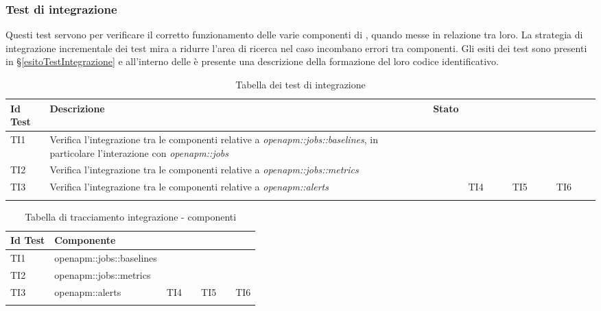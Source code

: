 \subsubsection{Test di integrazione}\label{testIntegrazione}
	Questi test servono per verificare il corretto funzionamento delle varie componenti di \ProjectName{}, quando messe in relazione tra loro.
	La strategia di integrazione incrementale dei test mira a ridurre l'area di ricerca nel caso incombano errori tra componenti.
	Gli esiti dei test sono presenti in §\ref{esitoTestIntegrazione} e all'interno delle \vNormeDiProgetto{} è presente una descrizione della formazione del loro codice identificativo.	
	
	
	\begin{longtable}{  | >{\centering\arraybackslash}m{2.5cm} 
						| >{\raggedright\arraybackslash}m{9cm} 
						| >{\centering\arraybackslash}m{3.5cm} | }	
        	\hline
        		\textbf{Id Test} & \textbf{Descrizione} & \textbf{Stato} \\ \hline
        	\endhead
        					
				TI1 & Verifica l’integrazione tra le componenti relative a \textit{openapm::jobs::baselines}, in particolare l’interazione con \textit{openapm::jobs}
						& \donetext{} \\ \hline
				TI2 & Verifica l’integrazione tra le componenti relative a \textit{openapm::jobs::metrics}
						& \donetext{} \\ \hline
				TI3 & Verifica l’integrazione tra le componenti relative a \textit{openapm::alerts}
						& \donetext{} &
				TI4 & & \donetext{} &
				TI5 & & \donetext{} &
				TI6 & & \donetext{}					
						\\ \hline				
				
	\caption[Test di integrazione]{Tabella dei test di integrazione}			
  		
	\end{longtable}


	\begin{longtable}{  | >{\centering\arraybackslash}m{2cm} 
						| >{\centering\arraybackslash}m{11cm} | }
			
        	\hline
        		\textbf{Id Test} & \textbf{Componente} \\ \hline
        	\endhead
        					
				TI1 	& openapm\-::\-jobs\-::\-baselines
						\\ \hline
				TI2  	& openapm\-::\-jobs\-::\-metrics
						\\ \hline
				TI3 	& openapm\-::\-alerts & 
				TI4		&	&
				TI5		&	&
				TI6		& \\ \hline
				
	\caption[Tracciamento test di integrazione - componenti]{Tabella di tracciamento integrazione - componenti}			
  		
	\end{longtable}

